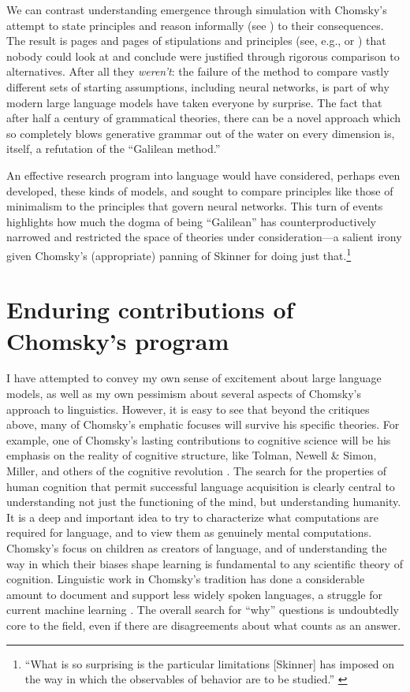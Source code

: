 \documentclass[output=paper,colorlinks,citecolor=brown
]{langscibook}
\begin{document}
We can contrast understanding emergence through simulation with Chomsky's attempt to state principles and reason informally (see \cite{pullum1989formal}) to their consequences. The result is pages and pages of stipulations and principles (see, e.g., \cite{collins2016formalization} or \cite{chomsky1995minimalist}) that nobody could look at and conclude were justified through rigorous comparison to alternatives. After all they \emph{weren't}: the failure of the method to compare vastly different sets of starting assumptions, including neural networks, is part of why modern large language models have taken everyone by surprise. The fact that after half a century of grammatical theories, there can be a novel approach which so completely blows generative grammar out of the water on every dimension is, itself, a refutation of the ``Galilean method.''

An effective research program into language would have considered, perhaps even developed, these kinds of models, and sought to compare principles like those of minimalism to the principles that govern neural networks. This turn of events highlights how much the dogma of being ``Galilean'' has counterproductively narrowed and restricted the space of theories under consideration---a salient irony given Chomsky's (appropriate) panning of Skinner for doing just that.\footnote{ ``What is so surprising is the particular limitations [Skinner] has imposed on the way in which the observables of behavior are to be studied.'' \citep{chomsky1959chomsky}} 

%

\section{Enduring contributions of Chomsky's program}

I have attempted to convey my own sense of excitement about large language models, as well as my own pessimism about several aspects of Chomsky's approach to linguistics. However, it is easy to see that beyond the critiques above, many of Chomsky's emphatic focuses will survive his specific theories. For example, one of Chomsky's lasting contributions to cognitive science will be his emphasis on the reality of cognitive structure, like Tolman, Newell \& Simon, Miller, and others of the cognitive revolution \citep{nadel2003cognitive,margaret2008mind}. The search for the properties of human cognition that permit successful language acquisition is clearly central to understanding not just the functioning of the mind, but understanding humanity. It is a deep and important idea to try to characterize what computations are required for language, and to view them as genuinely mental computations. Chomsky's focus on children as creators of language, and of understanding the way in which their biases shape learning is fundamental to any scientific theory of cognition. Linguistic work in Chomsky's tradition has done a considerable amount to document and support less widely spoken languages, a struggle for current machine learning \citep{blasi2021systematic}. The overall search for ``why'' questions is undoubtedly core to the field, even if there are disagreements about what counts as an answer.
\end{document}
